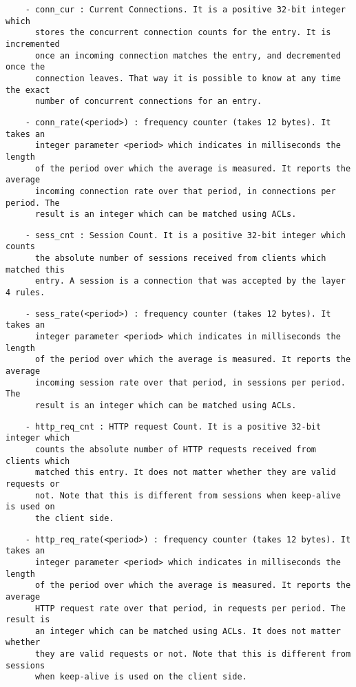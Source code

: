 \begin{verbatim}
    - conn_cur : Current Connections. It is a positive 32-bit integer which
      stores the concurrent connection counts for the entry. It is incremented
      once an incoming connection matches the entry, and decremented once the
      connection leaves. That way it is possible to know at any time the exact
      number of concurrent connections for an entry.
\end{verbatim}

\begin{verbatim}
    - conn_rate(<period>) : frequency counter (takes 12 bytes). It takes an
      integer parameter <period> which indicates in milliseconds the length
      of the period over which the average is measured. It reports the average
      incoming connection rate over that period, in connections per period. The
      result is an integer which can be matched using ACLs.
\end{verbatim}

\begin{verbatim}
    - sess_cnt : Session Count. It is a positive 32-bit integer which counts
      the absolute number of sessions received from clients which matched this
      entry. A session is a connection that was accepted by the layer 4 rules.
\end{verbatim}

\begin{verbatim}
    - sess_rate(<period>) : frequency counter (takes 12 bytes). It takes an
      integer parameter <period> which indicates in milliseconds the length
      of the period over which the average is measured. It reports the average
      incoming session rate over that period, in sessions per period. The
      result is an integer which can be matched using ACLs.
\end{verbatim}

\begin{verbatim}
    - http_req_cnt : HTTP request Count. It is a positive 32-bit integer which
      counts the absolute number of HTTP requests received from clients which
      matched this entry. It does not matter whether they are valid requests or
      not. Note that this is different from sessions when keep-alive is used on
      the client side.
\end{verbatim}

\begin{verbatim}
    - http_req_rate(<period>) : frequency counter (takes 12 bytes). It takes an
      integer parameter <period> which indicates in milliseconds the length
      of the period over which the average is measured. It reports the average
      HTTP request rate over that period, in requests per period. The result is
      an integer which can be matched using ACLs. It does not matter whether
      they are valid requests or not. Note that this is different from sessions
      when keep-alive is used on the client side.
\end{verbatim}

